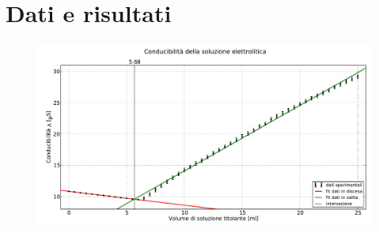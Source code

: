 \section*{Dati e risultati}

\begin{figure}
    \includegraphics[scale=0.5]{Rette_von_Fitt.pdf}
    \caption{}
    \label{fig:meas}
\end{figure}
